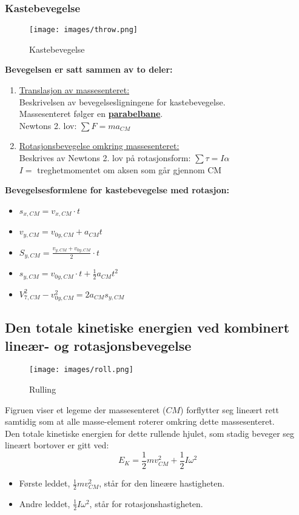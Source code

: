 \documentclass[12pt]{article}
\begin{document}
\subsubsection{Kastebevegelse}

\begin{figure} [H]
    \centering
    \texttt{[image: images/throw.png]}
    \caption{Kastebevegelse}
\end{figure}
\textbf{Bevegelsen er satt sammen av to deler:}
\begin{enumerate}
    \item \underline{Translasjon av massesenteret:}\\
    Beskrivelsen av bevegelsesligningene for kastebevegelse.\\
    Massesenteret følger en \underline{\textbf{parabelbane}}.\\
    Newtons 2. lov: $\sum F = ma_{CM}$

    \item \underline{Rotasjonsbevegelse omkring massesenteret:}\\
    Beskrives av Newtons 2. lov på rotasjonsform: $\sum \tau = I\alpha$\\
    $I =$ treghetmomentet om aksen som går gjennom CM
\end{enumerate}
\textbf{Bevegelsesformlene for kastebevegelse med rotasjon:}
\begin{itemize}
    \item[] $s_{x,CM} = v_{x,CM}\cdot t$
    \item[] $v_{y,CM} = v_{0y,CM} + a_{CM}t$
    \item[] $S_{y,CM} = \frac{v_{y,CM}+v_{0y,CM}}{2}\cdot t$
    \item[] $s_{y,CM} = v_{0y,CM}\cdot t + \frac{1}{2}a_{CM}t^2$
    \item[] $V^2_{7,CM} - v^2_{0y,CM} = 2a_{CM}s_{y,CM}$
\end{itemize}

\subsection{Den totale kinetiske energien ved kombinert lineær- og rotasjonsbevegelse}
\begin{figure} [H]
    \centering
    \texttt{[image: images/roll.png]}
    \caption{Rulling}
\end{figure}
Figruen viser et legeme der massesenteret ($CM$) forflytter seg lineært rett samtidig som at alle masse-element roterer omkring dette massesenteret.\\
Den totale kinetiske energien for dette rullende hjulet, som stadig beveger seg lineært bortover er gitt ved:
$$E_K = \frac{1}{2}mv^2_{CM}+\frac{1}{2}I\omega^2$$
\begin{itemize}
    \item[] Første leddet, $\frac{1}{2}mv^2_{CM}$, står for den lineære hastigheten.\\
    \item[] Andre leddet, $\frac{1}{2}I\omega^2$, står for rotasjonshastigheten.
\end{itemize}
\end{document}
